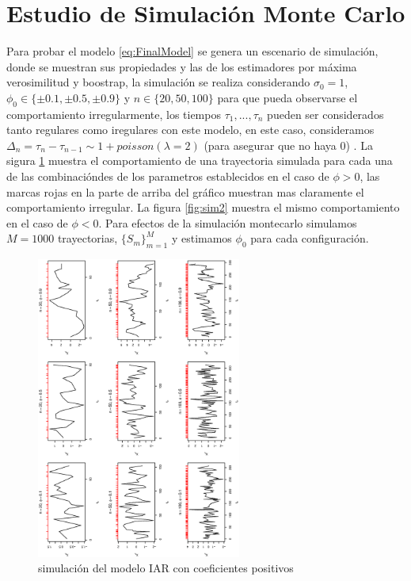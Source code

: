 \section{Estudio de Simulación Monte Carlo}
Para probar el modelo \ref{eq:FinalModel} se genera un escenario de simulación, donde se muestran sus propiedades y las de los estimadores por máxima verosimilitud y boostrap, 
la simulación se realiza considerando $\sigma_0 = 1$, $\phi_0 \in \lbrace\pm 0.1 ,\pm 0.5,\pm 0.9\rbrace$ y $n \in \lbrace20, 50, 100\rbrace$ para que pueda
observarse el comportamiento irregularmente, los tiempos $\tau_1 , ... , \tau_n$ pueden ser considerados tanto regulares como iregulares con este modelo, en este caso, consideramos
$\Delta_n = \tau_n - \tau_{n-1} \sim 1 + poisson(\lambda = 2)$ (para asegurar que no haya 0) . La sigura \ref{fig:sim1} muestra el comportamiento
de una trayectoria simulada para cada una de las combinacióndes de los parametros establecidos en el caso de $\phi > 0$, las marcas rojas en la parte de arriba del gráfico
muestran mas claramente el comportamiento irregular. La figura \ref{fig:sim2} muestra el mismo comportamiento en el caso de $\phi < 0$. Para efectos de la simulación montecarlo
simulamos $M=1000$ trayectorias, $\lbrace S_m\rbrace_{m=1}^M$ y estimamos $\phi_0$ para cada configuración.
\begin{figure}[h]
    \includegraphics[width=0.6\textwidth, angle = 270]{Kap3/Fig_Cap3/sim1.eps}
    \caption{simulación del modelo IAR con coeficientes positivos}
    \label{fig:sim1}
\end{figure}

